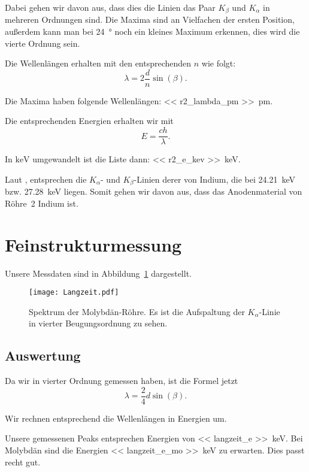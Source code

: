 Dabei gehen wir davon aus, dass dies die Linien das Paar $K_\beta$ und
$K_\alpha$ in mehreren Ordnungen sind. Die Maxima sind an Vielfachen der ersten
Position, außerdem kann man bei \SI{24}{\degree} noch ein kleines Maximum
erkennen, dies wird die vierte Ordnung sein.

Die Wellenlängen erhalten mit den entsprechenden $n$ wie folgt:
\[
    \lambda = 2 \frac dn \sin(\beta).
\]

Die Maxima haben folgende Wellenlängen: \SIlist{<< r2_lambda_pm
>>}{\pico\meter}.

Die entsprechenden Energien erhalten wir mit
\[
    E = \frac{c h}{\lambda}.
\]

In $\si{\kilo\electronvolt}$ umgewandelt ist die Liste dann: \SIlist{<<
r2_e_kev >>}{\kilo\electronvolt}.

Laut \cite[Tabelle~1-2]{x-ray_data_booklet}, entsprechen die $K_\alpha$- und
$K_\beta$-Linien derer von Indium, die bei \SI{24.21}{\kilo\electronvolt} bzw.
\SI{27.28}{\kilo\electronvolt} liegen. Somit gehen wir davon aus, dass das
Anodenmaterial von Röhre~2 Indium ist.

\section{Feinstrukturmessung}

Unsere Messdaten sind in Abbildung~\ref{fig:Langzeit} dargestellt.

\begin{figure}[htbp]
    \centering
    \texttt{[image: Langzeit.pdf]}
    \caption{%
        Spektrum der Molybdän-Röhre. Es ist die Aufspaltung der
        $K_\alpha$-Linie in vierter Beugungsordnung zu sehen.
    }
    \label{fig:Langzeit}
\end{figure}

\subsection{Auswertung}

Da wir in vierter Ordnung gemessen haben, ist die Formel jetzt
\[
    \lambda = \frac24 d \sin(\beta).
\]

Wir rechnen entsprechend die Wellenlängen in Energien um.

Unsere gemessenen Peaks entsprechen Energien von \SIlist{<< langzeit_e
>>}{\kilo\electronvolt}. Bei Molybdän sind die Energien \SIlist{<<
langzeit_e_mo >>}{\kilo\electronvolt} zu erwarten.
\parencite[Tabelle~1-2]{x-ray_data_booklet} Dies passt recht gut.

